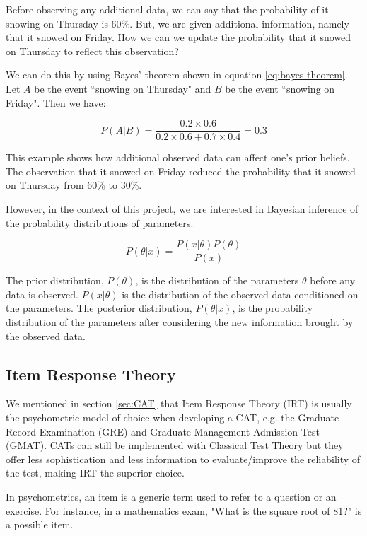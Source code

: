Before observing any additional data, we can say that the probability of it snowing on Thursday is 60\%. But, we are given additional information, namely that it snowed on Friday. How we can we update the probability that it snowed on Thursday to reflect this observation? \newline

We can do this by using Bayes' theorem shown in equation \eqref{eq:bayes-theorem}. Let $A$ be the event ``snowing on Thursday" and $B$ be the event ``snowing on Friday". Then we have:

$$P(A|B) = \dfrac{0.2 \times 0.6}{0.2 \times 0.6 + 0.7 \times 0.4} = 0.3$$

This example shows how additional observed data can affect one's prior beliefs. The observation that it snowed on Friday reduced the probability that it snowed on Thursday from 60\% to 30\%.
\newline

However, in the context of this project, we are interested in Bayesian inference of the probability distributions of parameters.

$$P(\theta|x) = \dfrac{P(x|\theta)P(\theta)}{P(x)}$$

The prior distribution, $P(\theta)$, is the distribution of the parameters $\theta$ before any data is observed. $P(x|\theta)$ is the distribution of the observed data conditioned on the parameters. The posterior distribution, $P(\theta|x)$, is the probability distribution of the parameters after considering the new information brought by the observed data.

\subsection{Item Response Theory}
\label{subsec:IRT}
We mentioned in section \ref{sec:CAT} that Item Response Theory (IRT) is usually the psychometric model of choice when developing a CAT, e.g. the Graduate Record Examination (GRE) and Graduate Management Admission Test (GMAT). CATs can still be implemented with Classical Test Theory but they offer less sophistication and less information to evaluate/improve the reliability of the test, making IRT the superior choice. \newline

In psychometrics, an item is a generic term used to refer to a question or an exercise. For instance, in a mathematics exam, "What is the square root of 81?" is a possible item. \newline

